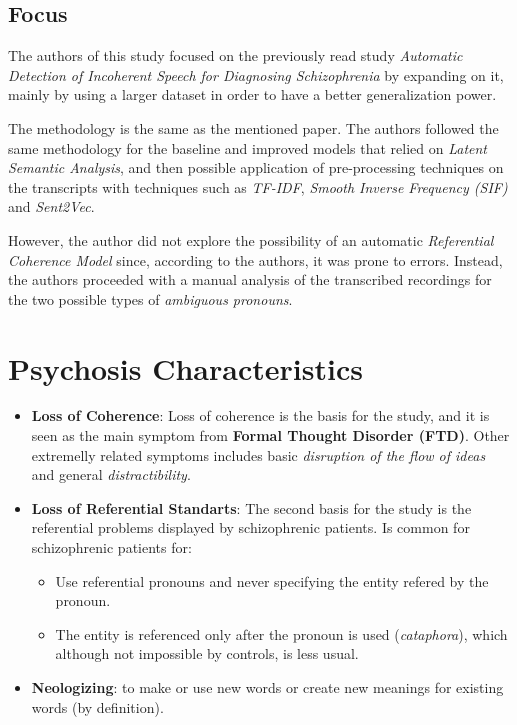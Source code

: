 \documentclass{Paper_Summary}
\begin{document}
\makepapertitle

\breakline

\begin{center}
    \section*{Focus}
\end{center}

    The authors of this study focused on the previously read study \emph{Automatic Detection of Incoherent Speech for Diagnosing Schizophrenia} by expanding on it, mainly by using a larger dataset in order to have a better generalization power.

    The methodology is the same as the mentioned paper. The authors followed the same methodology for the baseline and improved models that relied on \emph{Latent Semantic Analysis}, and then possible application of pre-processing techniques on the transcripts with techniques such as \emph{TF-IDF}, \emph{Smooth Inverse Frequency (SIF)} and \emph{Sent2Vec}.
    
    However, the author did not explore the possibility of an automatic \emph{Referential Coherence Model} since, according to the authors, it was prone to errors. Instead, the authors proceeded with a manual analysis of the transcribed recordings for the two possible types of \emph{ambiguous pronouns}.

\breakline

\newpage

\section{Psychosis Characteristics}
    \begin{itemize}
        \item \textbf{Loss of Coherence}: Loss of coherence is the basis for the study, and it is seen as the main symptom from \textbf{Formal Thought Disorder (FTD)}. Other extremelly related symptoms includes basic \emph{disruption of the flow of ideas} and general \emph{distractibility}.
        \item \textbf{Loss of Referential Standarts}: The second basis for the study is the referential problems displayed by schizophrenic patients. Is common for schizophrenic patients for:
        \begin{itemize}
            \item Use referential pronouns and never specifying the entity refered by the pronoun.
            \item The entity is referenced only after the pronoun is used (\emph{cataphora}), which although not impossible by controls, is less usual.
        \end{itemize}
        \item \textbf{Neologizing}: to make or use new words or create new meanings for existing words (by definition).
    \end{itemize}
\end{document}
